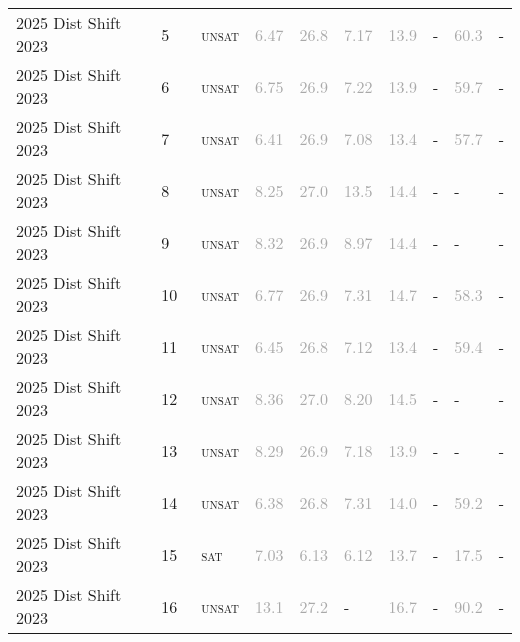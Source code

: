 \begin{center}
{\begin{longtable}{@{}llllllllll@{}}
2025 Dist Shift 2023 & 5 & ~\textsc{unsat} & \textcolor{darkgray}{6.47} & \textcolor{darkgray}{26.8} & \textcolor{darkgray}{7.17} & \textcolor{darkgray}{13.9} & - & \textcolor{darkgray}{60.3} & - \\
2025 Dist Shift 2023 & 6 & ~\textsc{unsat} & \textcolor{darkgray}{6.75} & \textcolor{darkgray}{26.9} & \textcolor{darkgray}{7.22} & \textcolor{darkgray}{13.9} & - & \textcolor{darkgray}{59.7} & - \\
2025 Dist Shift 2023 & 7 & ~\textsc{unsat} & \textcolor{darkgray}{6.41} & \textcolor{darkgray}{26.9} & \textcolor{darkgray}{7.08} & \textcolor{darkgray}{13.4} & - & \textcolor{darkgray}{57.7} & - \\
2025 Dist Shift 2023 & 8 & ~\textsc{unsat} & \textcolor{darkgray}{8.25} & \textcolor{darkgray}{27.0} & \textcolor{darkgray}{13.5} & \textcolor{darkgray}{14.4} & - & - & - \\
2025 Dist Shift 2023 & 9 & ~\textsc{unsat} & \textcolor{darkgray}{8.32} & \textcolor{darkgray}{26.9} & \textcolor{darkgray}{8.97} & \textcolor{darkgray}{14.4} & - & - & - \\
2025 Dist Shift 2023 & 10 & ~\textsc{unsat} & \textcolor{darkgray}{6.77} & \textcolor{darkgray}{26.9} & \textcolor{darkgray}{7.31} & \textcolor{darkgray}{14.7} & - & \textcolor{darkgray}{58.3} & - \\
2025 Dist Shift 2023 & 11 & ~\textsc{unsat} & \textcolor{darkgray}{6.45} & \textcolor{darkgray}{26.8} & \textcolor{darkgray}{7.12} & \textcolor{darkgray}{13.4} & - & \textcolor{darkgray}{59.4} & - \\
2025 Dist Shift 2023 & 12 & ~\textsc{unsat} & \textcolor{darkgray}{8.36} & \textcolor{darkgray}{27.0} & \textcolor{darkgray}{8.20} & \textcolor{darkgray}{14.5} & - & - & - \\
2025 Dist Shift 2023 & 13 & ~\textsc{unsat} & \textcolor{darkgray}{8.29} & \textcolor{darkgray}{26.9} & \textcolor{darkgray}{7.18} & \textcolor{darkgray}{13.9} & - & - & - \\
2025 Dist Shift 2023 & 14 & ~\textsc{unsat} & \textcolor{darkgray}{6.38} & \textcolor{darkgray}{26.8} & \textcolor{darkgray}{7.31} & \textcolor{darkgray}{14.0} & - & \textcolor{darkgray}{59.2} & - \\
2025 Dist Shift 2023 & 15 & ~\textsc{sat} & \textcolor{darkgray}{7.03} & \textcolor{darkgray}{6.13} & \textcolor{darkgray}{6.12} & \textcolor{darkgray}{13.7} & - & \textcolor{darkgray}{17.5} & - \\
2025 Dist Shift 2023 & 16 & ~\textsc{unsat} & \textcolor{darkgray}{13.1} & \textcolor{darkgray}{27.2} & - & \textcolor{darkgray}{16.7} & - & \textcolor{darkgray}{90.2} & - \\

\end{longtable}}
\end{center}
